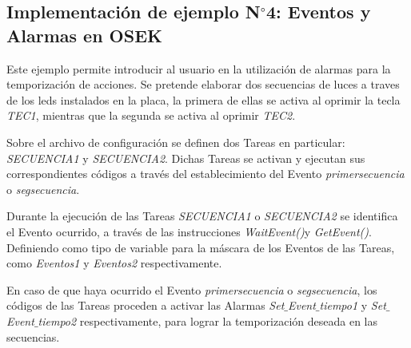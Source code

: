 \documentclass[12pt,letterpaper]{article}
\begin{document}
\subsection{Implementación de ejemplo N$^{\circ}$4: Eventos y Alarmas en OSEK}
Este ejemplo permite introducir al usuario en la utilización de alarmas para la temporización de acciones. Se pretende elaborar dos secuencias de luces a traves de los leds instalados en la placa, la primera de ellas se activa al oprimir la tecla \textit{TEC1}, mientras que la segunda se activa al oprimir \textit{TEC2}.

Sobre el archivo de configuración se definen dos Tareas en particular: \textit{SECUENCIA1} y \textit{SECUENCIA2}. Dichas Tareas se activan y ejecutan sus correspondientes códigos a través del establecimiento del Evento \textit{primersecuencia} o \textit{segsecuencia}.

Durante la ejecución de las Tareas \textit{SECUENCIA1} o \textit{SECUENCIA2} se identifica el Evento ocurrido, a través de las instrucciones \textit{WaitEvent()}y \textit{GetEvent()}. Definiendo como tipo de variable para la máscara de los Eventos de las Tareas, como \textit{Eventos1} y \textit{Eventos2} respectivamente.

En caso de que haya ocurrido el Evento \textit{primersecuencia} o \textit{segsecuencia}, los códigos de las Tareas proceden a activar las Alarmas \textit{Set$\_$Event$\_$tiempo1} y \textit{Set$\_$Event$\_$tiempo2} respectivamente, para lograr la temporización deseada en las secuencias.
\end{document}
